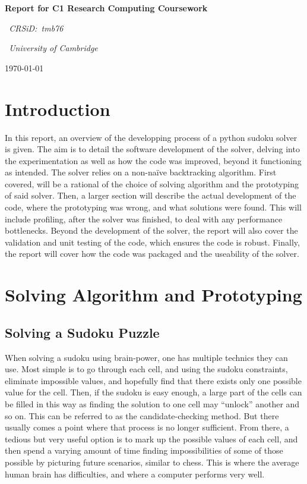 \documentclass[12pt]{report} %
\begin{document}
\begin{titlepage}
  \centering
  \vspace*{2cm}
  {\LARGE\bfseries Report for C1 Research Computing Coursework\par}
  \vspace{1cm}
  {\Large\itshape\ CRSiD:\ tmb76\par}
  \vspace{1cm}
  {\Large\itshape\ University of Cambridge\par}
  \vfill
  {\large\today\par}
\end{titlepage}

\tableofcontents

\newpage

\chapter{Introduction}

In this report, an overview of the developping process of a python sudoku solver is given. The aim is to detail the software development of the solver, delving into the experimentation as well as how the code was improved, beyond it functioning as intended. The solver relies on a non-naïve backtracking algorithm. First covered, will be a rational of the choice of solving algorithm and the prototyping of said solver. Then, a larger section will describe the actual development of the code, where the prototyping was wrong, and what solutions were found. This will include profiling, after the solver was finished, to deal with any performance bottlenecks. Beyond the development of the solver, the report will also cover the validation and unit testing of the code, which ensures the code is robust. Finally, the report will cover how the code was packaged and the useability of the solver.


\chapter{Solving Algorithm and Prototyping}

\section{Solving a Sudoku Puzzle}

When solving a sudoku using brain-power, one has multiple technics they can use. Most simple is to go through each cell, and using the sudoku constraints, eliminate impossible values, and hopefully find that there exists only one possible value for the cell. Then, if the sudoku is easy enough, a large part of the cells can be filled in this way as finding the solution to one cell may ``unlock'' another and so on. This can be referred to as the candidate-checking method\cite{cornell_sudoku}.
But there usually comes a point where that process is no longer sufficient. From there, a tedious but very useful option is to mark up the possible values of each cell, and then spend a varying amount of time finding impossibilities of some of those possible by picturing future scenarios, similar to chess. This is where the average human brain has difficulties, and where a computer performs very well.
\end{document}
